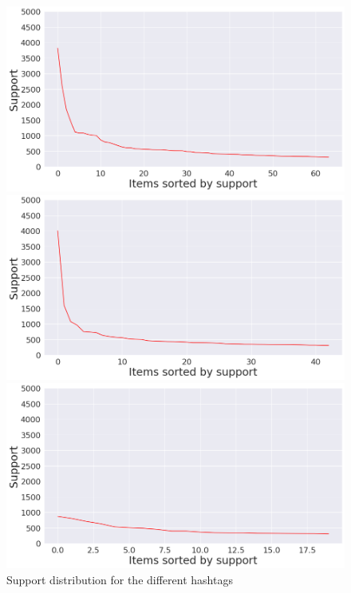 \documentclass[12pt,%
               a4paper,%
               oneside,openany,%
               titlepage,%
               headinclude,footinclude,%
               BCOR5mm,%
               cleardoublepage=empty,%
               tablecaptionabove,%
               floatperchapter,
               ]{scrreprt}                 %
\begin{document}
\begin{figure}[ht]
\begin{minipage}[b]{0.5\linewidth}
    \vspace{4ex}
  \end{minipage}
    \begin{minipage}[b]{0.5\linewidth}
    \centering
    \includegraphics[width=.9\linewidth]{Figures/Support_distrubution_pfizer.png}
    \vspace{4ex}
  \end{minipage}
  \begin{minipage}[b]{0.5\linewidth}
    \centering
    \includegraphics[width=.9\linewidth]{Figures/Support_distrubution_Vaccine.png}
    \vspace{4ex}
  \end{minipage}%
     \begin{minipage}[b]{0.5\linewidth}
    \centering
    \includegraphics[width=.9\linewidth]{Figures/Support_distrubution_Freedom.png}
    \vspace{4ex}
  \end{minipage}

\caption{Support distribution for the different hashtags}
\label{Support distribution_ALL}
\end{figure}
\end{document}
